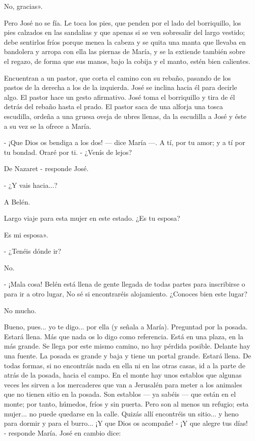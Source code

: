 \documentclass[12pt, twoside, openright]{book} %
\begin{document}
No, gracias». 

Pero José no se fía. Le toca los pies, que penden por el lado del borriquillo, los pies calzados en las sandalias y que apenas si se ven sobresalir del largo vestido; debe sentirlos fríos porque menea la cabeza y se quita una manta que llevaba en bandolera y arropa con ella las piernas de María, y se la extiende también sobre el regazo, de forma que sus manos, bajo la cobija y el manto, estén bien calientes. 

Encuentran a un pastor, que corta el camino con su rebaño, pasando de los pastos de la derecha a los de la izquierda. José se inclina hacia él para decirle algo. El pastor hace un gesto afirmativo. José toma el borriquillo y tira de él detrás del rebaño hasta el prado. El pastor saca de una alforja una tosca escudilla, ordeña a una gruesa oveja de ubres llenas, da la escudilla a José y éste a su vez se la ofrece a María. 

- ¡Que Dios os bendiga a los dos! — dice María —. A tí, por tu amor; y a tí por tu bondad. Oraré por ti. - ¿Venís de lejos? 

De Nazaret - responde José. 

- ¿Y vais hacia...? 

A Belén. 

Largo viaje para esta mujer en este estado. ¿Es tu esposa? 

Es mi esposa». 

- ¿Tenéis dónde ir? 

No. 

- ¡Mala cosa! Belén está llena de gente llegada de todas partes para inscribirse o para ir a otro lugar, No sé si encontraréis alojamiento. ¿Conoces bien este lugar? 

No mucho. 

Bueno, pues... yo te digo... por ella (y señala a María). Preguntad por la posada. Estará llena. Más que nada os lo digo como referencia. Está en una plaza, en la más grande. Se llega por este mismo camino, no hay pérdida posible. Delante hay una fuente. La posada es grande y baja y tiene un portal grande. Estará llena. De todas formas, si no encontráis nada en ella ni en las otras casas, id a la parte de atrás de la posada, hacia el campo. En el monte hay unos establos que algunas veces les sirven a los mercaderes que van a Jerusalén para meter a los animales que no tienen sitio en la posada. Son establos — ya sabéis — que están en el monte; por tanto, húmedos, fríos y sin puerta. Pero son al menos un refugio; esta mujer... no puede quedarse en la calle. Quizás allí encontréis un sitio... y heno para dormir y para el burro... ¡Y que Dios os acompañe! - ¡Y que alegre tus días! - responde María. José en cambio dice: 
\end{document}
